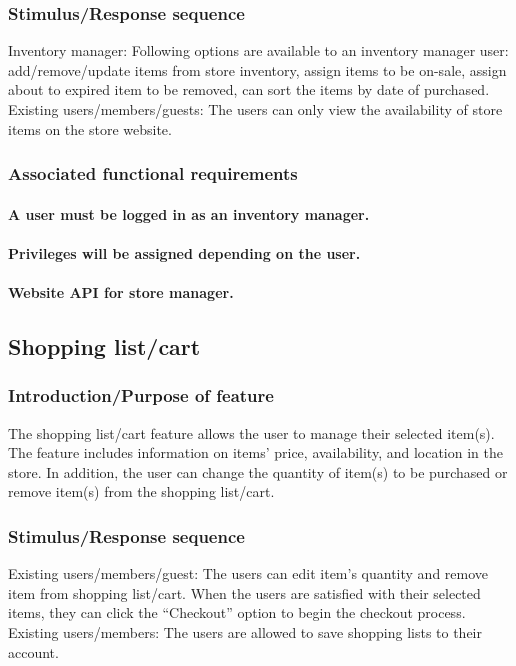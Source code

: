 \documentclass{scrreprt}
\begin{document}
\subsubsection{Stimulus/Response sequence}
Inventory manager:
Following options are available to an inventory manager user: add/remove/update items from store inventory, assign items to be on-sale, assign about to expired item to be removed, can sort the items by date of purchased.
Existing users/members/guests:
The users can only view the availability of store items on the store website.

\subsubsection{Associated functional requirements}
\paragraph[]{\normalfont A user must be logged in as an inventory manager.}
\paragraph[]{\normalfont Privileges will be assigned depending on the user.}
\paragraph[]{\normalfont Website API for store manager.}


\subsection{Shopping list/cart}
\subsubsection{Introduction/Purpose of feature}
The shopping list/cart feature allows the user to manage their selected item(s). The feature includes information on items’ price, availability, and location in the store. In addition, the user can change the quantity of item(s) to be purchased or remove item(s) from the shopping list/cart.

\subsubsection{Stimulus/Response sequence}
Existing users/members/guest:
The users can edit item’s quantity and remove item from shopping list/cart. When the users are satisfied with their selected items, they can click the “Checkout” option to begin the checkout process. 
Existing users/members:
The users are allowed to save shopping lists to their account.
\end{document}
